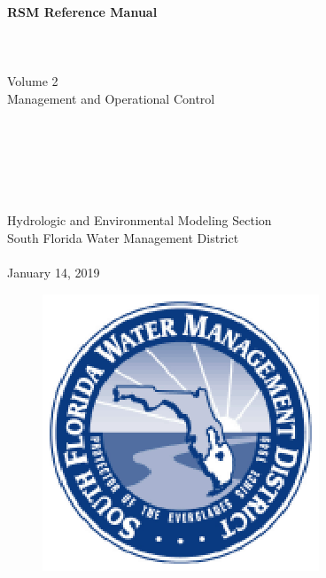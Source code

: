 \documentclass[10pt]{report}
\begin{document}
 \newpage
 \begin{center}

 \LARGE{\bf RSM Reference Manual }\\~\\~\\~\\

        \Large{Volume 2}\\
        \Large{Management and Operational Control}\\~\\~\\~\\~\\~\\~\\

 \large{Hydrologic and Environmental Modeling Section\\
        South Florida Water Management District}\\~\\

 \normalsize{January 14, 2019}
 \end{center}
 \begin{figure}[b]
 \centering
 \includegraphics[scale=1.]{Graphics/SFWMD_LogoBlue}
 \end{figure}

 \newpage 
 \tableofcontents
 \listoffigures
 \listoftables
 
 
 
 
 
 
 
 
 
 
 
 
 
 
 
 
 
 
% 
 
 
 
 
 
 
 
 
 
 
% 
% 
% 
% 
% 
% 




 
\end{document}
